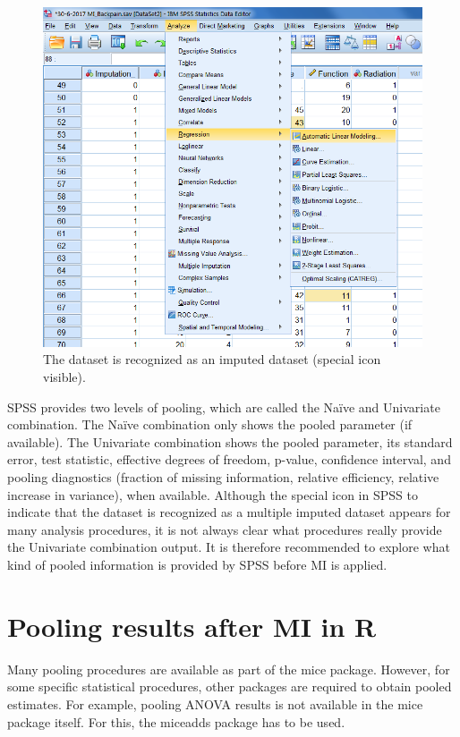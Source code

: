 \documentclass[]{book}
\begin{document}
\begin{figure}

{\centering \includegraphics[width=0.9\linewidth]{images/fig5.4b} 

}

\caption{The dataset is recognized as an imputed dataset (special icon visible).}\label{fig:fig5-4b}
\end{figure}

SPSS provides two levels of pooling, which are called the Naïve and
Univariate combination. The Naïve combination only shows the pooled
parameter (if available). The Univariate combination shows the pooled
parameter, its standard error, test statistic, effective degrees of
freedom, p-value, confidence interval, and pooling diagnostics (fraction
of missing information, relative efficiency, relative increase in
variance), when available. Although the special icon in SPSS to indicate
that the dataset is recognized as a multiple imputed dataset appears for
many analysis procedures, it is not always clear what procedures really
provide the Univariate combination output. It is therefore recommended
to explore what kind of pooled information is provided by SPSS before MI
is applied.

\section{Pooling results after MI in
R}\label{pooling-results-after-mi-in-r}

Many pooling procedures are available as part of the mice package.
However, for some specific statistical procedures, other packages are
required to obtain pooled estimates. For example, pooling ANOVA results
is not available in the mice package itself. For this, the miceadds
package has to be used.
\end{document}
